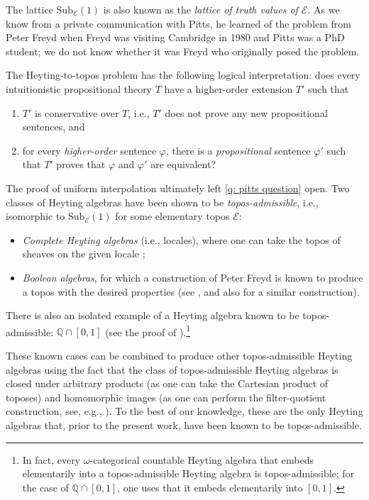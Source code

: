 \documentclass[12pt]{amsart}
\theoremstyle{plain}
\theoremstyle{definition}
\newcommand{\E}{\mathcal{E}}
\newcommand{\Sub}{\mathrm{Sub}}
\begin{document}
The lattice $\Sub_{\E}(1)$ is also known as the \emph{lattice of truth values of $\E$}. 
As we know from a private communication with Pitts, he learned of the problem from Peter Freyd when Freyd was visiting Cambridge in 1980 and Pitts was a PhD student; we do not know whether it was Freyd who originally posed the problem.

The Heyting-to-topos problem has the following logical interpretation: does every intuitionistic propositional theory $T$ have a higher-order extension $T'$ such that 
\begin{enumerate}
    \item $T'$ is conservative over $T$, i.e., $T'$ does not prove any new propositional sentences, and
    \item for every \emph{higher-order} sentence $\varphi$, there is a \emph{propositional} sentence $\varphi'$ such that $T'$ proves that $\varphi$ and $\varphi'$ are equivalent?
\end{enumerate}


The proof of uniform interpolation ultimately left \cref{q: pitts question} open.
Two classes of Heyting algebras have been shown to be \emph{topos-admissible}, i.e., isomorphic to $\Sub_{\E}(1)$ for some elementary topos $\E$:
\begin{itemize}

    \item \emph{Complete Heyting algebras} (i.e., locales), where one can take the topos of sheaves on the given locale \cite[Ch.~IX.5]{MacLane1994};
    
    \item \emph{Boolean algebras}, for which a construction of Peter Freyd is known to produce a topos with the desired properties (see \cite[Exercise~9.11]{johnstonetopos}, and also \cite[Example~4.8]{Pitts2002} for a similar construction).
    
\end{itemize}
There is also an isolated example of a Heyting algebra known to be topos-admissible: $\mathbb{Q} \cap [0,1]$ (see the proof of \cite[Prop.~2.71]{Freyd1972}).\footnote{In fact, every $\omega$-categorical countable Heyting algebra that embeds elementarily into a topos-admissible Heyting algebra is topos-admissible; for the case of $\mathbb{Q} \cap [0,1]$, one uses that it embeds elementarily into $[0,1]$.}

These known cases can be combined to produce other topos-admissible Heyting algebras using the fact that the class of topos-admissible Heyting algebras is closed under arbitrary products (as one can take the Cartesian product of toposes) and homomorphic images (as one can perform the filter-quotient construction, see, e.g., \cite[Thm.~2, p.~261]{MacLane1994}).
To the best of our knowledge, these are the only Heyting algebras that, prior to the present work, have been known to be topos-admissible.
\end{document}
